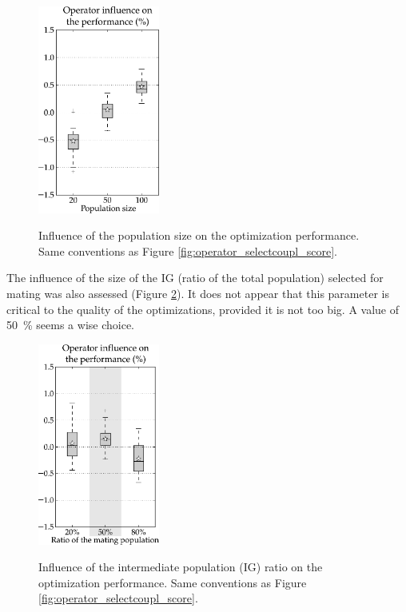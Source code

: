 \documentclass[twocol]{ametsoc}
\begin{document}
\begin{figure}[htb]
	\begin{center}
		\noindent\includegraphics[width=4cm,angle=0]{figures/option_taillepop_score.pdf}\\
	\end{center}
	\caption{Influence of the population size on the optimization performance. Same conventions as Figure \ref{fig:operator_selectcoupl_score}.}
	\label{fig:option_taillepop_score}
\end{figure}

The influence of the size of the IG (ratio of the total population) selected for mating was also assessed (Figure \ref{fig:option_popratio_score}). It does not appear that this parameter is critical to the quality of the optimizations, provided it is not too big. A value of 50~\% seems a wise choice.

\begin{figure}[htb]
	\begin{center}
		\noindent\includegraphics[width=4cm,angle=0]{figures/option_popratio_score.pdf}\\
	\end{center}
	\caption{Influence of the intermediate population (IG) ratio on the optimization performance. Same conventions as Figure \ref{fig:operator_selectcoupl_score}.}
	\label{fig:option_popratio_score}
\end{figure}
\end{document}
